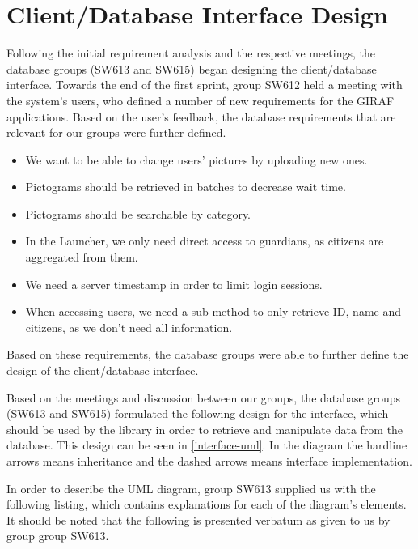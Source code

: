 \section{Client/Database Interface Design}
Following the initial requirement analysis and the respective meetings, the
database groups (SW613 and SW615) began designing the client/database interface.
Towards the end of the first sprint, group SW612 held a meeting with the
system's users, who defined a number of new requirements for the GIRAF
applications. Based on the user's feedback, the database requirements that are
relevant for our groups were further defined.

\begin{itemize}
  \item We want to be able to change users' pictures by uploading new ones.
  \item Pictograms should be retrieved in batches to decrease wait time.
  \item Pictograms should be searchable by category.
  \item In the Launcher, we only need direct access to guardians, as citizens
  are aggregated from them.
  \item We need a server timestamp in order to limit login sessions.
  \item When accessing users, we need a sub-method to only retrieve ID, name and
  citizens, as we don't need all information.
\end{itemize}

Based on these requirements, the database groups were able to further define
the design of the client/database interface.\nl

Based on the meetings and discussion between our groups, the database groups
(SW613 and SW615) formulated the following design for the interface, which
should be used by the  library in order to retrieve and
manipulate data from the database. This design can be seen in
\autoref{interface-uml}. In the diagram the hardline arrows means inheritance
and the dashed arrows means interface implementation.


In order to describe the UML diagram, group SW613 supplied us with the following
listing, which contains explanations for each of the diagram's elements. It
should be noted that the following is presented verbatum as given to us by group
group SW613.

